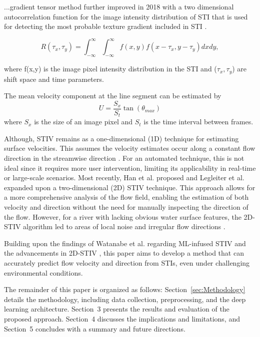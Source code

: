 \documentclass[12pt]{elsarticle}
\begin{document}
...gradient tensor method  further improved in 2018 with a two dimensional autocorrelation function for the image intensity distribution of STI that is used for detecting the most probable texture gradient included in STI \cite{fujita2019efficient}.

\begin{equation}
    R(\tau_x, \tau_y) = \int_{-\infty}^{\infty}\int_{-\infty}^{\infty} f(x, y) f(x - \tau_x, y - \tau_y) dx dy,
\end{equation}

where f(x,y) is the image pixel intensity distribution in the STI and (\(\tau_x, \tau_y\)) are shift space and time parameters.

The mean velocity component at the line segment can be  estimated by
\begin{equation}
    U=\frac{S_x}{S_t}\tan(\theta_{max})
\end{equation}
where $S_x$ is the size of an image pixel and $S_t$ is the time interval between frames. 

Although, STIV remains as a one-dimensional (1D) technique for estimating surface velocities. This assumes the velocity estimates occur along a constant flow direction in the streamwise direction \cite{fujita2019efficient, fujita2020application, fujita2007development,watanabe2021improving}. For an automated technique, this is not ideal since it requires more user intervention, limiting its applicability in real-time or large-scale scenarios. Most recently, Han et al. \cite{han_two-dimensional_2021} proposed  and Legleiter et al. \cite{legleiter2024two} expanded upon a two-dimensional (2D) STIV technique. This approach allows for a more comprehensive analysis of the flow field, enabling the estimation of both velocity and direction without the need for manually inspecting the direction of the flow. However, for a river with lacking obvious water surface features, the 2D-STIV algorithm led to areas of local noise and irregular flow directions \cite{legleiter2024two}.

Building upon the findings of Watanabe et al. \cite{watanabe2021improving} regarding ML-infused STIV and the advancements in 2D-STIV \cite{han_two-dimensional_2021, legleiter2024two}, this paper aims to develop a method that can accurately predict flow velocity and direction from STIs, even under challenging environmental conditions.

The remainder of this paper is organized as follows: Section~\ref{sec:Methodology} details the methodology, including data collection, preprocessing, and the deep learning architecture. Section~3 presents the results and evaluation of the proposed approach. Section~4 discusses the implications and limitations, and Section~5 concludes with a summary and future directions.
\end{document}
